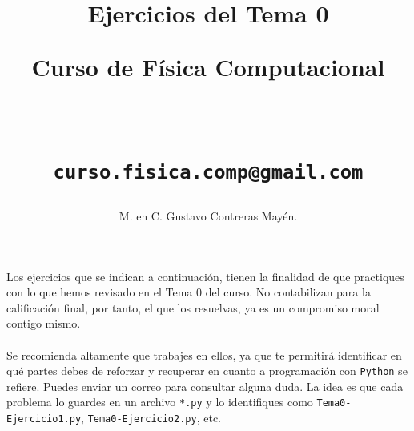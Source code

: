 \documentclass[12pt]{article}
\author{M. en C. Gustavo Contreras Mayén.}
\title{Ejercicios del Tema 0 \\ \begin{Large} Curso de Física Computacional\end{Large} \\
\begin{small}
\texttt{curso.fisica.comp@gmail.com}
\end{small}}
\date{ }
\begin{document}
\maketitle
\fontsize{14}{14}\selectfont
Los ejercicios que se indican a continuación, tienen la finalidad de que practiques con lo que hemos revisado en el Tema 0 del curso. No contabilizan para la calificación final, por tanto, el que los resuelvas, ya es un compromiso moral contigo mismo.
\\
\\
Se recomienda altamente que trabajes en ellos, ya que te permitirá identificar en qué partes debes de reforzar y recuperar en cuanto a programación con \texttt{Python} se refiere. Puedes enviar un correo para consultar alguna duda. La idea es que cada problema lo guardes en un archivo \texttt{*.py} y lo identifiques como \texttt{Tema0-Ejercicio1.py}, \texttt{Tema0-Ejercicio2.py}, etc.
\end{document}
